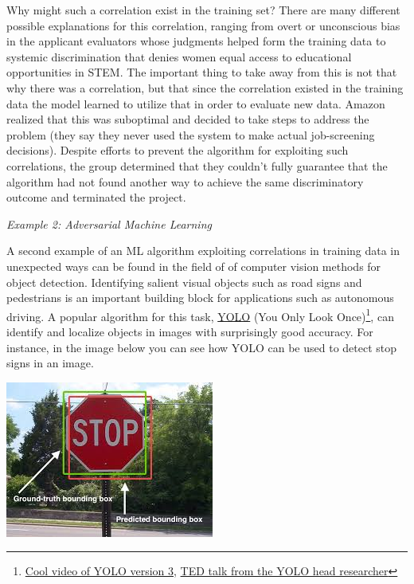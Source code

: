 \documentclass[assignment01_Solutions]{subfiles}
\begin{document}
Why might such a correlation exist in the training set?  There are many different possible explanations for this correlation, ranging from overt or unconscious bias in the applicant evaluators whose judgments helped form the training data to systemic discrimination that denies women equal access to educational opportunities in STEM.  The important thing to take away from this is not that why there was a correlation, but that since the correlation existed in the training data the model learned to utilize that in order to evaluate new data.  Amazon realized that this was suboptimal and decided to take steps to address the problem (they say they never used the system to make actual job-screening decisions).  Despite efforts to prevent the algorithm for exploiting such correlations, the group determined that they couldn't fully guarantee that the algorithm had not found another way to achieve the same discriminatory outcome and terminated the project.


\item \emph{Example 2: Adversarial Machine Learning}

A second example of an ML algorithm exploiting correlations in training data in unexpected ways can be found in the field of of computer vision methods for object detection.  Identifying salient visual objects such as road signs and pedestrians is an important building block for applications such as autonomous driving.  A popular algorithm for this task, \href{https://pjreddie.com/darknet/yolo/}{YOLO} (You Only Look Once)\footnote{\href{https://www.youtube.com/watch?time_continue=77&v=MPU2HistivI}{Cool video of YOLO version 3}, \href{https://www.youtube.com/watch?v=Cgxsv1riJhI}{TED talk from the YOLO head researcher}}, can identify and localize objects in images with surprisingly good accuracy.  For instance, in the image below you can see how YOLO can be used to detect stop signs in an image.
\begin{center}
\includegraphics[width=0.6\linewidth]{figures/stopsignyolo}
\end{center}
\end{document}

